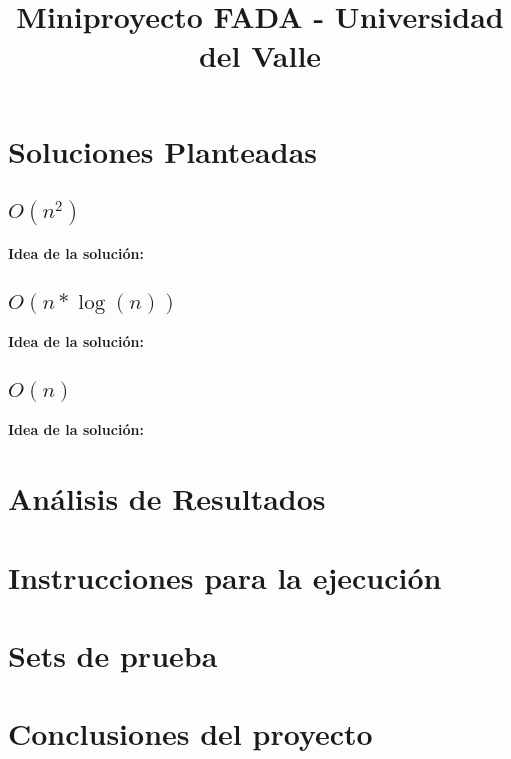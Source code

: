 \documentclass{article}
\title{Miniproyecto FADA - Universidad del Valle}
\date{}
\author{}
\begin{document}
	\maketitle

	\section{Soluciones Planteadas}
		\subsection{$O(n^2)$}
			\textbf{Idea de la solución:}

		\subsection{$O(n*\log(n))$}
			\textbf{Idea de la solución:}
		\subsection{$O(n)$}
			\textbf{Idea de la solución:}

	\section{Análisis de Resultados}

	\section{Instrucciones para la ejecución}

	\section{Sets de prueba}

	\section{Conclusiones del proyecto}
\end{document}

